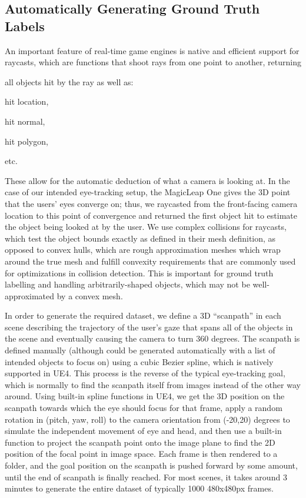 \subsection{Automatically Generating Ground Truth Labels}

An important feature of real-time game engines is native and efficient support
for raycasts, which are functions that shoot rays from one point to another,
returning
\begin{inlist}
\item all objects hit by the ray as well as:
\item hit location,
\item hit normal,
\item hit polygon,
\item etc.
\end{inlist}
These allow for the automatic deduction of what a camera is looking at. In the
case of our intended eye-tracking setup, the MagicLeap One gives the 3D point that the
users' eyes converge on; thus, we raycasted from the front-facing camera
location to this point of convergence and returned the first object hit to
estimate the object being looked at by the user. We use complex collisions for raycasts, which test the object bounds exactly as defined in their mesh definition, as opposed to convex hulls, which are rough approximation meshes which wrap around the true mesh and fulfill convexity requirements that are commonly used for optimizations in collision detection. This is important for ground truth labelling and handling arbitrarily-shaped objects, which may not be well-approximated by a convex mesh.

In order to generate the required dataset, we define a 3D ``scanpath'' in each scene
describing the trajectory of the user's gaze that spans all of the objects in
the scene and eventually causing the camera to turn 360 degrees. The scanpath is defined manually (although could be generated automatically with a list of intended objects to focus on) using a cubic Bezier spline, which is natively supported in UE4. This process is the reverse of the typical eye-tracking goal, which is normally to find the scanpath itself from images instead of the other way around. Using built-in spline functions in UE4, we get the 3D position on the scanpath towards which the eye should focus for that frame, apply a random rotation in (pitch, yaw, roll) to the camera orientation from (-20,20) degrees to simulate the independent movement of eye and head, and then use a built-in function to project the scanpath point onto the image plane to find the 2D position of the focal point in image space. Each frame is then rendered to a folder, and the goal position on the scanpath is pushed forward by some amount, until the end of scanpath is finally reached. For most scenes, it takes around 3 minutes to generate the entire dataset of typically 1000 480x480px frames.

